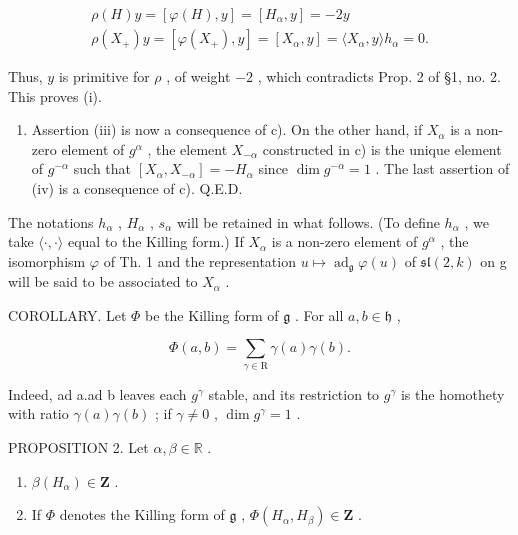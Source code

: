 \[
\begin{array}{c} \rho (H) y = [ \varphi (H), y ] = [ H _ {\alpha}, y ] = - 2 y \\ \rho (X _ {+}) y = [ \varphi (X _ {+}), y ] = [ X _ {\alpha}, y ] = \langle X _ {\alpha}, y \rangle h _ {\alpha} = 0. \end{array}
\]

Thus, \(y\) is primitive for \(\rho\) , of weight \(-2\) , which contradicts Prop. 2 of §1, no. 2. This proves (i).

\begin{enumerate}
\def\labelenumi{\alph{enumi})}
\setcounter{enumi}{4}
\tightlist
\item
  Assertion (iii) is now a consequence of c). On the other hand, if \(X_{\alpha}\) is a non-zero element of \(g^{\alpha}\) , the element \(X_{-\alpha}\) constructed in c) is the unique element of \(g^{-\alpha}\) such that \([X_{\alpha}, X_{-\alpha}] = -H_{\alpha}\) since \(\dim g^{-\alpha} = 1\) . The last assertion of (iv) is a consequence of c). Q.E.D.
\end{enumerate}

The notations \(h_{\alpha}\) , \(H_{\alpha}\) , \(s_{\alpha}\) will be retained in what follows. (To define \(h_{\alpha}\) , we take \(\langle\cdot,\cdot\rangle\) equal to the Killing form.) If \(X_{\alpha}\) is a non-zero element of \(g^{\alpha}\) , the isomorphism \(\varphi\) of Th. 1 and the representation \(u \mapsto \operatorname{ad}_{\mathfrak{g}} \varphi(u)\) of \(\mathfrak{sl}(2,k)\) on g will be said to be associated to \(X_{\alpha}\) .

COROLLARY. Let \(\Phi\) be the Killing form of \(\mathfrak{g}\) . For all \(a, b \in \mathfrak{h}\) ,

\[
\Phi (a, b) = \sum_ {\gamma \in \mathrm{R}} \gamma (a) \gamma (b).
\]

Indeed, ad a.ad b leaves each \(g^{\gamma}\) stable, and its restriction to \(g^{\gamma}\) is the homothety with ratio \(\gamma(a)\gamma(b)\) ; if \(\gamma\neq0\) , \(\dim g^{\gamma}=1\) .

PROPOSITION 2. Let \(\alpha, \beta \in \mathbb{R}\) .

\begin{enumerate}
\def\labelenumi{(\roman{enumi})}
\item
  \(\beta(H_{\alpha}) \in \mathbf{Z}\) .
\item
  If \(\Phi\) denotes the Killing form of \(\mathfrak{g}\) , \(\Phi(H_{\alpha}, H_{\beta}) \in \mathbf{Z}\) .
\end{enumerate}

